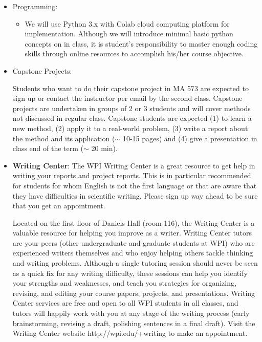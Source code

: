 \documentclass[11pt]{amsart}
\begin{document}
\begin{itemize}
\item Programming: 
\begin{itemize}
 \item We will use Python 3.x with Colab cloud computing platform for implementation. Although we will introduce minimal basic python concepts on in class, it is student's responsibility to master enough coding skills  through online resources to accomplish 
his/her course objective.

\end{itemize}





\item {Capstone Projects}: 
\begin{itemize}
 Students who want to do their capstone project in MA 573 are expected to sign up  or contact the instructor per email by  the second class. Capstone projects are undertaken in groups of 2 or 3 students and will cover methods not discussed in regular class. Capstone students are expected (1) to learn a new method, (2) apply it to a real-world problem, (3) write a report about the method and its application ($\sim$ 10-15 pages) and (4) give a presentation in class end of the term ($\sim$ 20 min).

\end{itemize}



\item \textbf{Writing Center}: The WPI Writing Center is a great resource to get help in writing your reports and project reports. This is in particular recommended for students for whom English is not the first language or that are aware that they have difficulties in scientific writing. Please sign up way ahead to be sure that you get an appointment.

Located on the first floor of Daniels Hall (room 116), the Writing Center is a valuable resource for helping you improve as a writer. Writing Center tutors are your peers (other undergraduate and graduate students at WPI) who are experienced writers themselves and who enjoy helping others tackle thinking and writing problems. Although a single tutoring session should never be seen as a quick fix for any writing difficulty, these sessions can help you identify your strengths and weaknesses, and teach you strategies for organizing, revising, and editing your course papers, projects, and presentations. Writing Center services are free and open to all WPI students in all classes, and tutors will happily work with you at any stage of the writing process (early brainstorming, revising a draft, polishing sentences in a final draft). Visit the Writing Center website 
{http://wpi.edu/+writing} to make an appointment.



\end{itemize}
\end{document}
